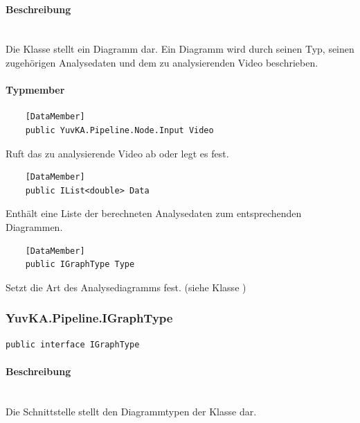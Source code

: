 \paragraph{Beschreibung}~\\
Die Klasse  stellt ein Diagramm dar. Ein Diagramm wird durch seinen Typ, seinen zugehörigen Analysedaten und dem zu analysierenden Video beschrieben.

\paragraph{Typmember}
\begin{itemize}

	\begin{verbatim}
	[DataMember]
	public YuvKA.Pipeline.Node.Input Video
	\end{verbatim}
	Ruft das zu analysierende Video ab oder legt es fest.
	
	\begin{verbatim}
	[DataMember]
	public IList<double> Data
	\end{verbatim}
	Enthält eine Liste der berechneten Analysedaten zum entsprechenden Diagrammen.
	
	\begin{verbatim}
	[DataMember]
	public IGraphType Type
	\end{verbatim}
	Setzt die Art des Analysediagramms fest. (siehe Klasse )

\end{itemize}

\subsubsection{YuvKA.Pipeline.IGraphType}
\begin{verbatim}
public interface IGraphType
\end{verbatim}

\paragraph{Beschreibung}~\\
Die Schnittstelle  stellt den Diagrammtypen der Klasse  dar.


